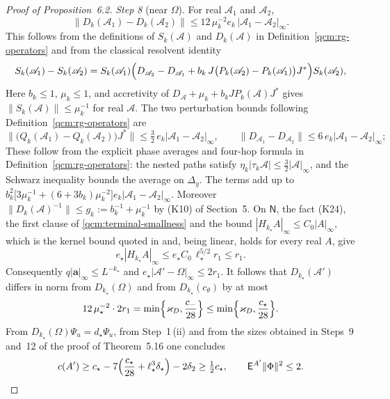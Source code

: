 \documentclass[11pt,letterpaper,reqno]{amsart}
\theoremstyle{definition}
\begin{document}
\begin{proof}[Proof of Proposition~6.2]
\emph{Step 8} (near $\Omega$).
For real $\mathscr A_1$ and $\mathscr A_2$,
\begin{equation*}
\|D_k(\mathscr A_1)-D_k(\mathscr A_2)\|\le12\,\mu_k^{-2}e_k\,|\mathscr A_1-\mathscr A_2|_\infty .
\end{equation*}
This follows from the definitions of $S_k(\mathscr A)$ and $D_k(\mathscr A)$ in Definition~\ref{qcm:rg-operators} and from the classical resolvent identity
\begin{equation*}
S_k(\mathscr A_1)-S_k(\mathscr A_2)=S_k(\mathscr A_1)\Bigl(D_{\mathscr A_2}-D_{\mathscr A_1}+b_k\,J\bigl(P_k(\mathscr A_2)-P_k(\mathscr A_1)\bigr)J^*\Bigr)S_k(\mathscr A_2),
\end{equation*}
Here $b_k\le1$, $\mu_k\le1$, and accretivity of $D_{\mathscr A}+\mu_k+b_kJP_k(\mathscr A)J^*$ gives $\|S_k(\mathscr A)\|\le\mu_k^{-1}$ for real $\mathscr A$. The two perturbation bounds following Definition~\ref{qcm:rg-operators} are
\begin{equation*}
\bigl\|\bigl(Q_k(\mathscr A_1)-Q_k(\mathscr A_2)\bigr)J^*\bigr\|\le\tfrac32\,e_k|\mathscr A_1-\mathscr A_2|_\infty,\qquad\|D_{\mathscr A_1}-D_{\mathscr A_2}\|\le6\,e_k|\mathscr A_1-\mathscr A_2|_\infty;
\end{equation*}
These follow from the explicit phase averages and four-hop formula in Definition~\ref{qcm:rg-operators}: the nested paths satisfy $\eta_k|\tau_k\mathscr A|\le\frac32|\mathscr A|_\infty$, and the Schwarz inequality bounds the average on $\Delta_y$.
The terms add up to $b_k^2\bigl[3\mu_k^{-1}+(6+3b_k)\mu_k^{-2}\bigr]e_k|\mathscr A_1-\mathscr A_2|_\infty$.
Moreover $\|D_k(\mathscr A)^{-1}\|\le g_k:=b_k^{-1}+\mu_k^{-1}$ by (K10) of Section~5.
On $\mathsf N$, the fact (K24), the first clause of \eqref{qcm:terminal-smallness} and the bound $|H_{k_\star}A|_\infty\le C_0|A|_\infty$, which is the kernel bound quoted in \cite[equation~(10.16) and the definition of the terminal constant $C_0$ in Section~21.4]{QEDConstruction} and, being linear, holds for every real $A$, give
\begin{equation*}
e_\star|H_{k_\star}A|_\infty\le e_\star C_0\,\ell_\star^{5/2}r_1\le r_1 .
\end{equation*}
Consequently $q|\mathbf a|_\infty\le L^{-k_\star}$ and $e_\star|\mathscr A'-\Omega|_\infty\le2r_1$.
It follows that $D_{k_\star}(\mathscr A')$ differs in norm from $D_{k_\star}(\Omega)$ and from $D_{k_\star}(c_\theta)$ by at most
\begin{equation*}
12\,\mu_\star^{-2}\cdot2r_1=\min\Bigl\{\varkappa_D,\frac{c_-}{28}\Bigr\}\le\min\Bigl\{\varkappa_D,\frac{c_\star}{28}\Bigr\}.
\end{equation*}
From $D_{k_\star}(\Omega)\Psi_u=d_\star\Psi_u$, from Step~1\,(ii) and from the sizes obtained in Steps~9 and~12 of the proof of Theorem~5.16 one concludes
\begin{equation*}
c(A')\ge c_\star-7\Bigl(\frac{c_\star}{28}+\ell_\star^3\delta_\star\Bigr)-2\delta_2\ge\tfrac12c_\star,\qquad\mathsf E^{A'}\|\Phi\|^2\le2 .
\end{equation*}


\end{proof}
\end{document}
